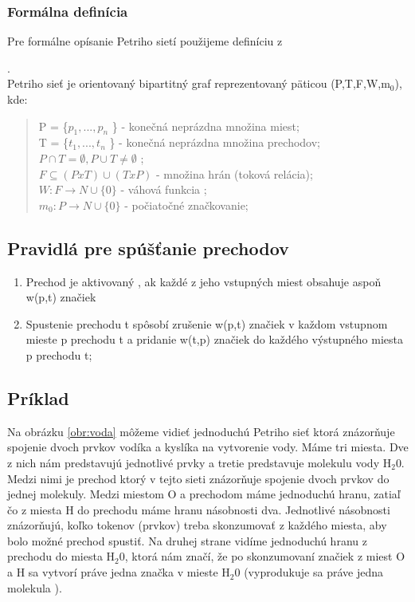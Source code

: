 \subsubsection*{Formálna definícia}
Pre formálne opísanie Petriho sietí použijeme definíciu z \cite{Modelovacie_formalizmy}

.\\
	Petriho sieť je orientovaný bipartitný graf reprezentovaný päticou (P,T,F,W,m$_{0}$), kde:\\
\begin{quotation}
	\noindent P = \{$ p_{1}, ... ,p_{n}$ \} - konečná neprázdna množina miest;\\
	T = \{$ t_{1}, ... ,t_{n}$ \} - konečná neprázdna množina prechodov;\\
	{$ P \cap T = \emptyset,P \cup T \neq \emptyset $ }; \\
	{$ F\subseteq ( P x T ) \cup (T x P)$}  - množina hrán (toková relácia);\\
	{$ W : F \rightarrow N \cup \{ 0\}$} - váhová funkcia ;\\
	{$ m_{0} : P \rightarrow N \cup \{ 0\}$} - počiatočné značkovanie;\\
\end{quotation}

\subsection{Pravidlá pre spúšťanie prechodov}
\begin{enumerate}
	\item Prechod je aktivovaný , ak každé z jeho vstupných miest obsahuje aspoň w(p,t) značiek
	\item Spustenie prechodu t spôsobí zrušenie w(p,t) značiek v každom vstupnom mieste p prechodu t a pridanie w(t,p) značiek do každého výstupného miesta p prechodu t;	
\end{enumerate}

\subsection{Príklad}
Na obrázku \ref{obr:voda} môžeme vidieť jednoduchú Petriho sieť ktorá znázorňuje spojenie dvoch prvkov vodíka a kyslíka na vytvorenie vody. Máme tri miesta. Dve z nich nám predstavujú jednotlivé prvky a tretie predstavuje molekulu vody H$_{2} $0. Medzi nimi je prechod ktorý v tejto sieti znázorňuje spojenie dvoch prvkov do jednej molekuly. Medzi miestom O a prechodom máme jednoduchú hranu, zatiaľ čo z miesta H do prechodu máme hranu násobnosti dva. Jednotlivé násobnosti znázorňujú, koľko tokenov (prvkov) treba skonzumovať z každého miesta, aby bolo možné prechod spustiť. Na druhej strane vidíme jednoduchú hranu z prechodu do miesta  H$_{2} $0, ktorá nám značí, že po skonzumovaní značiek z miest O a H sa vytvorí práve jedna značka v mieste H$_{2} $0 (vyprodukuje sa práve jedna molekula ). 

